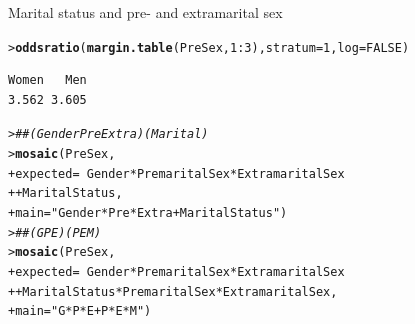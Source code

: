\documentclass[10pt,krantz2]{krantz}\usepackage[]{graphicx}\usepackage[]{color}
\makeatletter
\newcommand{\hlnum}[1]{\textcolor[rgb]{0.686,0.059,0.569}{#1}}%
\newcommand{\hlstr}[1]{\textcolor[rgb]{0.192,0.494,0.8}{#1}}%
\newcommand{\hlcom}[1]{\textcolor[rgb]{0.678,0.584,0.686}{\textit{#1}}}%
\newcommand{\hlopt}[1]{\textcolor[rgb]{0,0,0}{#1}}%
\newcommand{\hlstd}[1]{\textcolor[rgb]{0.345,0.345,0.345}{#1}}%
\newcommand{\hlkwc}[1]{\textcolor[rgb]{0.333,0.667,0.333}{#1}}%
\newcommand{\hlkwd}[1]{\textcolor[rgb]{0.737,0.353,0.396}{\textbf{#1}}}%
\newenvironment{kframe}{%
 \def\at@end@of@kframe{}%
 \ifinner\ifhmode%
  \def\at@end@of@kframe{\end{minipage}}%
  \begin{minipage}{\columnwidth}%
 \fi\fi%
 \def\FrameCommand##1{\hskip\@totalleftmargin \hskip-\fboxsep
 \colorbox{shadecolor}{##1}\hskip-\fboxsep
     \hskip-\linewidth \hskip-\@totalleftmargin \hskip\columnwidth}%
 \MakeFramed {\advance\hsize-\width
   \@totalleftmargin\z@ \linewidth\hsize
   \@setminipage}}%
 {\par\unskip\endMakeFramed%
 \at@end@of@kframe}
\newenvironment{knitrout}{}{} %
\renewenvironment{knitrout}{\small\renewcommand{\baselinestretch}{.85}}{} %
\makeatother
\begin{document}
\begin{Example}[marital1]{Marital status and pre- and extramarital sex}
\begin{knitrout}
\color{fgcolor}\begin{kframe}
\begin{alltt}
\hlstd{> }\hlkwd{oddsratio}\hlstd{(}\hlkwd{margin.table}\hlstd{(PreSex,} \hlnum{1} \hlopt{:} \hlnum{3}\hlstd{),} \hlkwc{stratum} \hlstd{=} \hlnum{1}\hlstd{,} \hlkwc{log} \hlstd{=} \hlnum{FALSE}\hlstd{)}
\end{alltt}
\begin{verbatim}
Women   Men 
3.562 3.605 
\end{verbatim}
\end{kframe}
\end{knitrout}



\begin{knitrout}
\color{fgcolor}\begin{kframe}
\begin{alltt}
\hlstd{> }\hlcom{## (Gender Pre Extra)(Marital)}
\hlstd{> }\hlkwd{mosaic}\hlstd{(PreSex,}
\hlstd{+ }       \hlkwc{expected} \hlstd{=} \hlopt{~} \hlstd{Gender} \hlopt{*} \hlstd{PremaritalSex} \hlopt{*} \hlstd{ExtramaritalSex}
\hlstd{+ }                  \hlopt{+} \hlstd{MaritalStatus,}
\hlstd{+ }       \hlkwc{main} \hlstd{=} \hlstr{"Gender*Pre*Extra + MaritalStatus"}\hlstd{)}
\hlstd{> }\hlcom{## (GPE)(PEM)}
\hlstd{> }\hlkwd{mosaic}\hlstd{(PreSex,}
\hlstd{+ }       \hlkwc{expected} \hlstd{=} \hlopt{~} \hlstd{Gender} \hlopt{*} \hlstd{PremaritalSex} \hlopt{*} \hlstd{ExtramaritalSex}
\hlstd{+ }                  \hlopt{+} \hlstd{MaritalStatus} \hlopt{*} \hlstd{PremaritalSex} \hlopt{*} \hlstd{ExtramaritalSex,}
\hlstd{+ }       \hlkwc{main} \hlstd{=} \hlstr{"G*P*E + P*E*M"}\hlstd{)}
\end{alltt}
\end{kframe}\begin{figure}[!htbp]


\end{figure}
\end{knitrout}
\end{Example}
\end{document}
